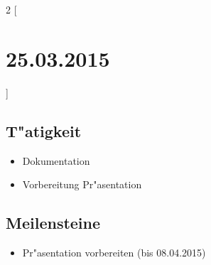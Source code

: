\documentclass[11pt,a4paper]{article}
\begin{document}
\begin{multicols}{2}
[\section*{  25.03.2015  }] 

\subsection*{T"atigkeit}
\begin{itemize}
\item Dokumentation
\item Vorbereitung Pr"asentation
\end{itemize}

\columnbreak

\subsection*{Meilensteine}

\begin{itemize}
\item Pr"asentation vorbereiten (bis 08.04.2015)
\end{itemize}

\end{multicols}
\end{document}
